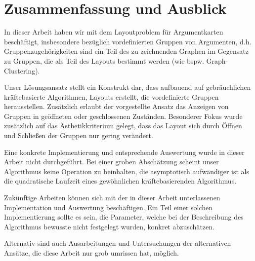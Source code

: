 \chapter{Zusammenfassung und Ausblick}
\label{ch:zsf}
In dieser Arbeit haben wir mit dem Layoutproblem für Argumentkarten beschäftigt, insbesondere bezüglich vordefinierten Gruppen von Argumenten, d.h. Gruppenzugehörigkeiten sind ein Teil des zu zeichnenden Graphen im Gegensatz zu Gruppen, die als Teil des Layouts bestimmt werden (wie bspw. Graph-Clustering).

Unser Lösungsansatz stellt ein Konstrukt dar, dass aufbauend auf gebräuchlichen kräftebasierte Algorithmen, Layouts erstellt, die vordefinierte Gruppen herausstellen. Zusätzlich erlaubt der vorgestellte Ansatz das Anzeigen von Gruppen in geöffneten oder geschlossenen Zuständen. Besonderer Fokus wurde zusätzlich auf das Ästhetikkriterium gelegt, dass das Layout sich durch Öffnen und Schließen der Gruppen nur gering verändert.

Eine konkrete Implementierung und entsprechende Auswertung wurde in dieser Arbeit nicht durchgeführt.
Bei einer groben Abschätzung scheint unser Algorithmus keine Operation zu beinhalten, die asymptotisch aufwändiger ist als die quadratische Laufzeit eines gewöhnlichen kräftebasierenden Algorithmus.

Zukünftige Arbeiten können sich mit der in dieser Arbeit unterlassenen Implementation und Auswertung beschäftigen. Ein Teil einer solchen Implementierung sollte es sein, die Parameter, welche bei der Beschreibung des Algorithmus bewusste nicht festgelegt wurden, konkret abzuschätzen.

Alternativ sind auch Ausarbeitungen und Untersuchungen der alternativen Ansätze, die diese Arbeit nur grob umrissen hat, möglich.

